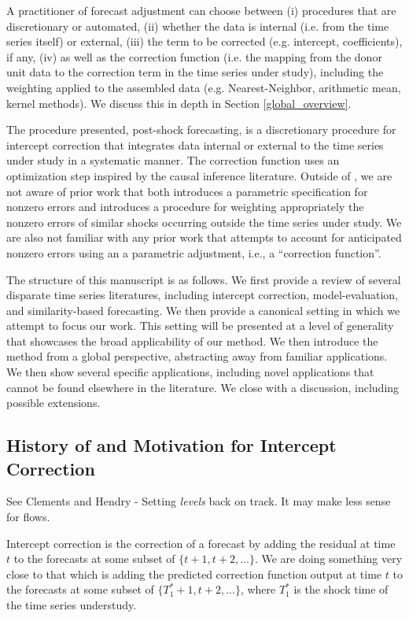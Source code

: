\documentclass[11pt]{article}
\theoremstyle{definition}
\begin{document}
A practitioner of forecast adjustment can choose between (i) procedures that are discretionary or automated, (ii) whether the data is internal (i.e. from the time series itself) or external, (iii) the term to be corrected (e.g. intercept, coefficients), if any, (iv) as well as the correction function (i.e. the mapping from the donor unit data to the correction term in the time series under study), including the weighting applied to the assembled data (e.g. Nearest-Neighbor, arithmetic mean, kernel methods).  We discuss this in depth in Section \ref{global_overview}.

The procedure presented, post-shock forecasting, is a discretionary procedure for intercept correction that integrates data internal or external to the time series under study in a systematic manner.  The correction function uses an optimization step inspired by the causal inference literature.  Outside of \citet{lin2021minimizing,lundquist2024volatility}, we are not aware of prior work that both introduces a parametric specification for nonzero errors and introduces a procedure for weighting appropriately the nonzero errors of similar shocks occurring outside the time series under study.  We are also not familiar with any prior work that attempts to account for anticipated nonzero errors using an a parametric adjustment, i.e., a ``correction function''.  

The structure of this manuscript is as follows.  We first provide a  review of several disparate time series literatures, including intercept correction, model-evaluation, and similarity-based forecasting.  We then provide a canonical setting in which we attempt to focus our work.  This setting will be presented at a level of generality that showcases the broad applicability of our method.  We then introduce the method from a global perspective, abstracting away from familiar applications.  We then show several specific applications, including novel applications that cannot be found elsewhere in the literature.  We close with a discussion, including possible extensions.

\subsection{History of and Motivation for Intercept Correction\label{intercept_correction}}
See Clements and Hendry - Setting \textit{levels} back on track.  It may make less sense for flows.

Intercept correction is the correction of a forecast by adding the residual at time $t$ to the forecasts at some subset of $\{t+1,t+2,...\}$.  We are doing something very close to that which is adding the predicted correction function output at time $t$ to the forecasts at some subset of $\{T_{1}^{*}+1,t+2,...\}$, where $T^{*}_{1}$ is the shock time of the time series understudy. 
\end{document}
